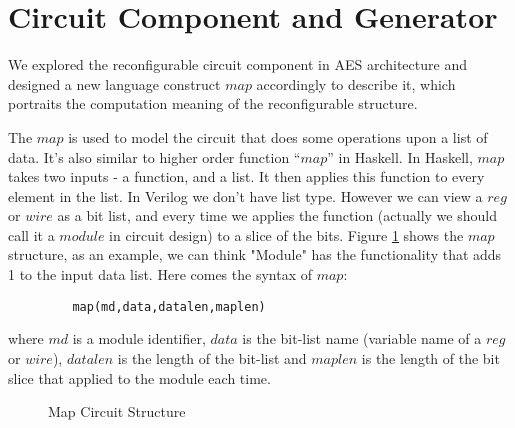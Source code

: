 \section{Circuit Component and Generator}\label{sec:syntax}
We explored the reconfigurable circuit component in AES architecture and designed a
new language construct $map$ accordingly to describe it, which portraits the computation 
meaning of the reconfigurable structure.

The $map$ is used to model the circuit that does some operations upon a list of data. It's also similar to higher order function ``$map$'' in Haskell. In Haskell, $map$ takes two inputs - a function, and a list. It then applies this function to every element in the list. In Verilog we don't have list type. However we can view a $reg$ or $wire$ as a bit list, and every time we applies the function (actually we should call it a $module$ in circuit design) to a slice of the bits. Figure \ref{fig-map} shows the $map$ structure, as an example, we can think  "Module" has the functionality that adds 1 to the input data list. Here comes the syntax of $map$:

\begin{verbatim}
         map(md,data,datalen,maplen)
\end{verbatim}
where $md$ is a module identifier, $data$ is the bit-list name (variable name of a $reg$ or $wire$), $datalen$ is the length of the bit-list and $maplen$ is the length of the bit slice that applied to the module each time.
\begin{figure}[ht]
\centering
{}
\caption{Map Circuit Structure}
\label{fig-map}
\end{figure}